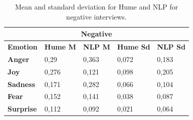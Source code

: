 \begin{table}[H]
    \centering
    \begin{tabular}{lllll}
    \multicolumn{5}{c}{\cellcolor[HTML]{BFBFBF}Negative}                                                                                                                                                \\ \hline
    \multicolumn{1}{|l|}{\textbf{Emotion}}  & \multicolumn{1}{c|}{\textbf{Hume M}} & \multicolumn{1}{c|}{\textbf{NLP M}} & \multicolumn{1}{c|}{\textbf{Hume Sd}} & \multicolumn{1}{c|}{\textbf{NLP Sd}} \\ \hline
    \multicolumn{1}{|l|}{\textbf{Anger}}    & 0,29                                 & 0,363                               & 0,072                                 & 0,183                                \\ \cline{1-1}
    \multicolumn{1}{|l|}{\textbf{Joy}}      & 0,276                                & 0,121                               & 0,098                                 & 0,205                                \\ \cline{1-1}
    \multicolumn{1}{|l|}{\textbf{Sadness}}  & 0,171                                & 0,282                               & 0,066                                 & 0,104                                \\ \cline{1-1}
    \multicolumn{1}{|l|}{\textbf{Fear}}     & 0,152                                & 0,141                               & 0,038                                 & 0,087                                \\ \cline{1-1}
    \multicolumn{1}{|l|}{\textbf{Surprise}} & 0,112                                & 0,092                               & 0,021                                 & 0,064                                \\ \cline{1-1}
    \end{tabular}
    \caption{Mean and standard deviation for Hume and NLP for negative interviews.}
    \label{tab:summery_hume_nlp_neg}
\end{table}



